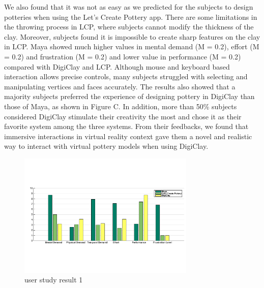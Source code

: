 We also found that it was not as easy as we predicted for the subjects to design potteries when using the Let's Create Pottery app. There are some limitations in the throwing process in LCP, where subjects cannot modify the thickness of the clay. Moreover, subjects found it is impossible to create sharp features on the clay in LCP. 
Maya showed much higher values in mental demand (M = 0.2), effort (M = 0.2) and frustration (M = 0.2) and lower value in performance (M = 0.2) compared with DigiClay and LCP. Although mouse and keyboard based interaction allows precise controls, many subjects struggled with selecting and manipulating vertices and faces accurately.
The results also showed that a majority subjects preferred the experience of designing pottery in DigiClay than those of Maya, as shown in Figure C. In addition, more than 50\% subjects considered DigiClay stimulate their creativity the most and chose it as their favorite system among the three systems. From their feedbacks, we found that immersive interactions in virtual reality context gave them a novel and realistic way to interact with virtual pottery models when using DigiClay.
\begin{figure}
  \includegraphics[width=0.75\textwidth]{f7.pdf}
\caption{user study result 1}
\label{fig:1}       %
\end{figure}

